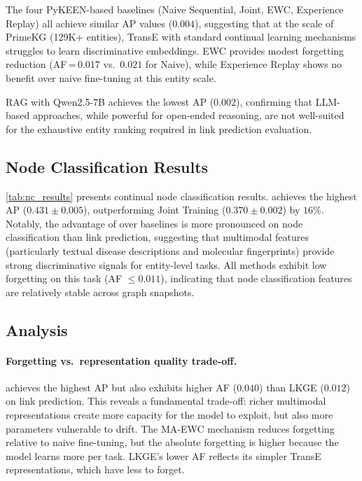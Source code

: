 The four PyKEEN-based baselines (Naive Sequential, Joint, EWC, Experience Replay) all achieve similar AP values ($0.004$), suggesting that at the scale of PrimeKG (129K+ entities), TransE with standard continual learning mechanisms struggles to learn discriminative embeddings.
EWC provides modest forgetting reduction (AF\,=\,$0.017$ vs.\ $0.021$ for Naive), while Experience Replay shows no benefit over naive fine-tuning at this entity scale.

RAG with Qwen2.5-7B achieves the lowest AP ($0.002$), confirming that LLM-based approaches, while powerful for open-ended reasoning, are not well-suited for the exhaustive entity ranking required in link prediction evaluation.

\subsection{Node Classification Results}
\label{subsec:nc_results}



\cref{tab:nc_results} presents continual node classification results.
\ours achieves the highest AP ($0.431 \pm 0.005$), outperforming Joint Training ($0.370 \pm 0.002$) by $16\%$.
Notably, the advantage of \ours over baselines is more pronounced on node classification than link prediction, suggesting that multimodal features (particularly textual disease descriptions and molecular fingerprints) provide strong discriminative signals for entity-level tasks.
All methods exhibit low forgetting on this task (AF $\leq 0.011$), indicating that node classification features are relatively stable across graph snapshots.

\subsection{Analysis}
\label{subsec:analysis}

\paragraph{Forgetting vs.\ representation quality trade-off.}
\ours achieves the highest AP but also exhibits higher AF ($0.040$) than LKGE ($0.012$) on link prediction.
This reveals a fundamental trade-off: richer multimodal representations create more capacity for the model to exploit, but also more parameters vulnerable to drift.
The MA-EWC mechanism reduces forgetting relative to naive fine-tuning, but the absolute forgetting is higher because the model learns more per task.
LKGE's lower AF reflects its simpler TransE representations, which have less to forget.

